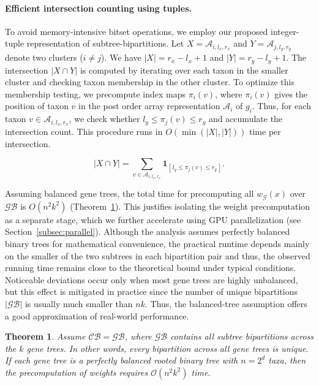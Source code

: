\documentclass[10pt,a4paper]{article}
\newtheorem{theorem}{Theorem}[section]
\begin{document}
\paragraph{Efficient intersection counting using tuples.} 
To avoid memory-intensive bitset operations, we employ our proposed integer-tuple representation of subtree-bipartitions.  
Let $X = \mathcal{A}_{i,l_x,r_x}$ and $Y = \mathcal{A}_{j,l_y,r_y}$ denote two clusters ($i \neq j$).  
We have $|X| = r_x - l_x + 1$ and $|Y| = r_y - l_y + 1$.  
The intersection $|X \cap Y|$ is computed by iterating over each taxon in the smaller cluster and checking taxon membership in the other cluster.  To optimize this membership testing, we precompute index maps $\pi_i(v)$, where $\pi_i(v)$ gives the position of taxon $v$ in the post order array representation $\mathcal{A}_i$ of $g_i$. Thus, for each taxon $v \in \mathcal{A}_{i,l_{x},r_{x}}$, we check whether $l_y \leq \pi_j(v) \leq r_y$ and accumulate the intersection count. This procedure runs in $O(\min(|X|, |Y|))$ time per intersection.

\[
|X \cap Y| = 
\sum_{v \in \mathcal{A}_{i,l_x,r_x}} 
\mathbf{1}_{[\,l_y \le \pi_j(v) \le r_y\,]}.
\]


Assuming balanced gene trees, the total time for precomputing all $w_{\mathcal{G}}(x)$ over $\mathcal{GB}$ is $O(n^2 k^2)$ (Theorem~\ref{th:precompute-bound}).  
This justifies isolating the weight precomputation as a separate stage, which we further accelerate using GPU parallelization (see Section~\ref{subsec:parallel}). Although the analysis assumes perfectly balanced binary trees for mathematical convenience, the practical runtime depends mainly on the smaller of the two subtrees in each bipartition pair and thus, the observed running time remains close to the theoretical bound under typical conditions. Noticeable deviations occur only when most gene trees are highly unbalanced, but this effect is mitigated in practice since the number of unique bipartitions $|\mathcal{GB}|$ is usually much smaller than $nk$. Thus, the balanced-tree assumption offers a good approximation of real-world performance.




\begin{theorem}
\label{th:precompute-bound}
Assume $\mathcal{CB} = \mathcal{GB}$, where $\mathcal{GB}$ contains all subtree bipartitions across the $k$ gene trees. In other words, every bipartition across all gene trees is unique. If each gene tree is a perfectly balanced rooted binary tree with $n = 2^{d}$ taxa, then the precomputation of weights requires $\mathcal{O}(n^{2}k^{2})$ time.

\end{theorem}
\end{document}
